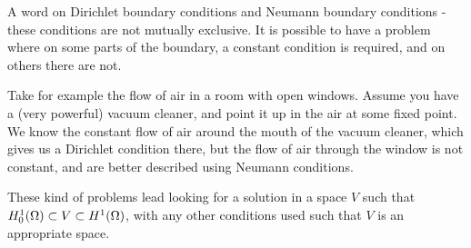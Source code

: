 A word on Dirichlet boundary conditions and Neumann boundary 
conditions - these conditions are not mutually exclusive.
It is possible to have a problem where on some parts of the boundary, 
a constant condition is required, and on others there are not.

Take for example the flow of air in a room with open windows. 
Assume you have a (very powerful) vacuum cleaner,
 and point it up in the air at some fixed point. 
We know the constant flow of air around the mouth of the vacuum cleaner, which 
gives us a Dirichlet condition there, but the flow of air through the 
window is not constant, and are better described using Neumann conditions.

These kind of problems lead looking for a solution in a space $V$ such that 
$H^1_0(\Omega) \subset V \subset H^1(\Omega)$, with any other conditions used such 
that $V$ is an appropriate space.
